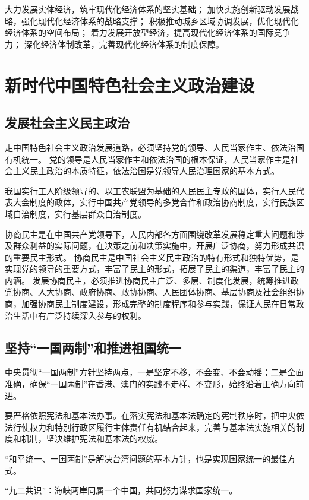 \documentclass[a4paper, UTF8]{ctexart}
\begin{document}
    大力发展实体经济，筑牢现代化经济体系的坚实基础；
    加快实施创新驱动发展战略，强化现代化经济体系的战略支撑；
    积极推动城乡区域协调发展，优化现代化经济体系的空间布局；
    着力发展开放型经济，提高现代化经济体系的国际竞争力；
    深化经济体制改革，完善现代化经济体系的制度保障。

\section{新时代中国特色社会主义政治建设}
    \subsection{发展社会主义民主政治}
    走中国特色社会主义政治发展道路，必须坚持党的领导、人民当家作主、依法治国有机统一。
    党的领导是人民当家作主和依法治国的根本保证，人民当家作主是社会主义民主政治的本质特征，依法治国是党领导人民治理国家的基本方式。

    我国实行工人阶级领导的、以工农联盟为基础的人民民主专政的国体，实行人民代表大会制度的政体，实行中国共产党领导的多党合作和政治协商制度，实行民族区域自治制度，实行基层群众自治制度。

    协商民主是在中国共产党领导下，人民内部各方面围绕改革发展稳定重大问题和涉及群众利益的实际问题，在决策之前和决策实施中，开展广泛协商，努力形成共识的重要民主形式。
    协商民主是中国社会主义民主政治的特有形式和独特优势，是实现党的领导的重要方式，丰富了民主的形式，拓展了民主的渠道，丰富了民主的内涵。
    发展协商民主，必须推进协商民主广泛、多层、制度化发展，统筹推进政党协商、人大协商、政府协商、政协协商、人民团体协商、基层协商及社会组织协商，加强协商民主制度建设，形成完整的制度程序和参与实践，保证人民在日常政治生活中有广泛持续深入参与的权利。

    \subsection{坚持“一国两制”和推进祖国统一}
    中央贯彻“一国两制”方针坚持两点，一是坚定不移，不会变、不会动摇；二是全面准确，确保“一国两制”在香港、澳门的实践不走样、不变形，始终沿着正确方向前进。

    要严格依照宪法和基本法办事。在落实宪法和基本法确定的宪制秩序时，把中央依法行使权力和特别行政区履行主体责任有机结合起来，完善与基本法实施相关的制度和机制，坚决维护宪法和基本法的权威。

    “和平统一、一国两制”是解决台湾问题的基本方针，也是实现国家统一的最佳方式。

    “九二共识”：海峡两岸同属一个中国，共同努力谋求国家统一。
\end{document}
